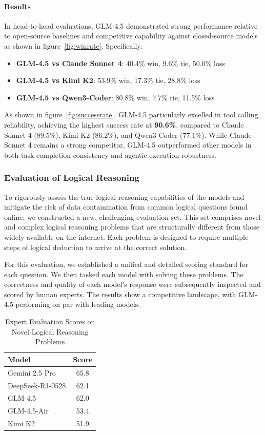 \documentclass{article}
\theoremstyle{definition}
\begin{document}
\paragraph{Results} In head-to-head evaluations, GLM-4.5 demonstrated strong performance relative to open-source baselines and competitive capability against closed-source models as shown in figure~\ref{fig:winrate}. Specifically:

\begin{itemize}
  \item \textbf{GLM-4.5 vs Claude Sonnet 4}: 40.4\% win, 9.6\% tie, 50.0\% loss
  \item \textbf{GLM-4.5 vs Kimi K2}: 53.9\% win, 17.3\% tie, 28.8\% loss
  \item \textbf{GLM-4.5 vs Qwen3-Coder}: 80.8\% win, 7.7\% tie, 11.5\% loss
\end{itemize}

As shown in figure~\ref{fig:successrate}, GLM-4.5 particularly excelled in tool calling reliability, achieving the highest success rate at \textbf{90.6\%}, compared to Claude Sonnet 4 (89.5\%), Kimi-K2 (86.2\%), and Qwen3-Coder (77.1\%). While Claude Sonnet 4 remains a strong competitor, GLM-4.5 outperformed other models in both task completion consistency and agentic execution robustness.

\subsubsection{Evaluation of Logical Reasoning}
To rigorously assess the true logical reasoning capabilities of the models and mitigate the risk of data contamination from common logical questions found online, we constructed a new, challenging evaluation set. This set comprises novel and complex logical reasoning problems that are structurally different from those widely available on the internet. Each problem is designed to require multiple steps of logical deduction to arrive at the correct solution.

For this evaluation, we established a unified and detailed scoring standard for each question. We then tasked each model with solving these problems. The correctness and quality of each model's response were subsequently inspected and scored by human experts. The results show a competitive landscape, with GLM-4.5 performing on par with leading models.

\begin{table}[!h]
\centering
\caption{Expert Evaluation Scores on Novel Logical Reasoning Problems}
\label{tab:logic-reasoning-results}
\begin{tabular}{lc}
\toprule
\textbf{Model} & \textbf{Score} \\
\midrule
Gemini 2.5 Pro & 65.8 \\
DeepSeek-R1-0528 & 62.1 \\
GLM-4.5 & 62.0 \\
GLM-4.5-Air & 53.4 \\
Kimi K2 & 51.9 \\
\bottomrule
\end{tabular}
\end{table}
\end{document}
